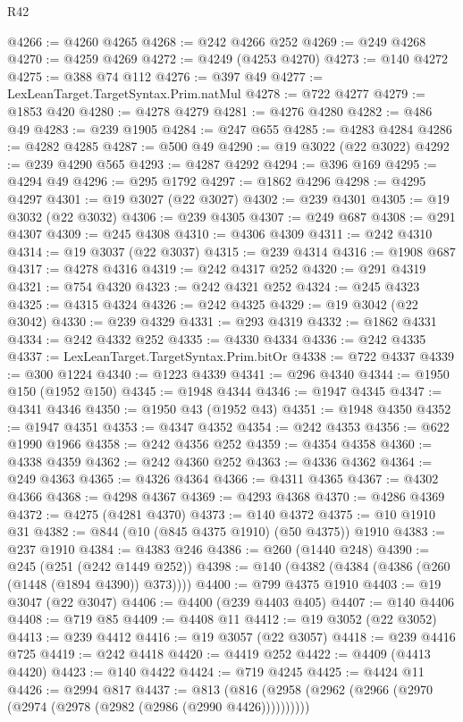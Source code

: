 \begin{lexlean}{R42}
\begin{coremodule}
{@4266 := @4260 @4265
@4268 := @242 @4266 @252
@4269 := @249 @4268
@4270 := @4259 @4269
@4272 := @4249 (@4253 @4270)
@4273 := @140 @4272
@4275 := @388 @74 @112
@4276 := @397 @49
@4277 := LexLeanTarget.TargetSyntax.Prim.natMul
@4278 := @722 @4277
@4279 := @1853 @420
@4280 := @4278 @4279
@4281 := @4276 @4280
@4282 := @486 @49
@4283 := @239 @1905
@4284 := @247 @655
@4285 := @4283 @4284
@4286 := @4282 @4285
@4287 := @500 @49
@4290 := @19 @3022 (@22 @3022)
@4292 := @239 @4290 @565
@4293 := @4287 @4292
@4294 := @396 @169
@4295 := @4294 @49
@4296 := @295 @1792
@4297 := @1862 @4296
@4298 := @4295 @4297
@4301 := @19 @3027 (@22 @3027)
@4302 := @239 @4301
@4305 := @19 @3032 (@22 @3032)
@4306 := @239 @4305
@4307 := @249 @687
@4308 := @291 @4307
@4309 := @245 @4308
@4310 := @4306 @4309
@4311 := @242 @4310
@4314 := @19 @3037 (@22 @3037)
@4315 := @239 @4314
@4316 := @1908 @687
@4317 := @4278 @4316
@4319 := @242 @4317 @252
@4320 := @291 @4319
@4321 := @754 @4320
@4323 := @242 @4321 @252
@4324 := @245 @4323
@4325 := @4315 @4324
@4326 := @242 @4325
@4329 := @19 @3042 (@22 @3042)
@4330 := @239 @4329
@4331 := @293 @4319
@4332 := @1862 @4331
@4334 := @242 @4332 @252
@4335 := @4330 @4334
@4336 := @242 @4335
@4337 := LexLeanTarget.TargetSyntax.Prim.bitOr
@4338 := @722 @4337
@4339 := @300 @1224
@4340 := @1223 @4339
@4341 := @296 @4340
@4344 := @1950 @150 (@1952 @150)
@4345 := @1948 @4344
@4346 := @1947 @4345
@4347 := @4341 @4346
@4350 := @1950 @43 (@1952 @43)
@4351 := @1948 @4350
@4352 := @1947 @4351
@4353 := @4347 @4352
@4354 := @242 @4353
@4356 := @622 @1990 @1966
@4358 := @242 @4356 @252
@4359 := @4354 @4358
@4360 := @4338 @4359
@4362 := @242 @4360 @252
@4363 := @4336 @4362
@4364 := @249 @4363
@4365 := @4326 @4364
@4366 := @4311 @4365
@4367 := @4302 @4366
@4368 := @4298 @4367
@4369 := @4293 @4368
@4370 := @4286 @4369
@4372 := @4275 (@4281 @4370)
@4373 := @140 @4372
@4375 := @10 @1910 @31
@4382 := @844 (@10 (@845 @4375 @1910) (@50 @4375)) @1910
@4383 := @237 @1910
@4384 := @4383 @246
@4386 := @260 (@1440 @248)
@4390 := @245 (@251 (@242 @1449 @252))
@4398 := @140 (@4382 (@4384 (@4386 (@260 (@1448 (@1894 @4390)) @373))))
@4400 := @799 @4375 @1910
@4403 := @19 @3047 (@22 @3047)
@4406 := @4400 (@239 @4403 @405)
@4407 := @140 @4406
@4408 := @719 @85
@4409 := @4408 @11
@4412 := @19 @3052 (@22 @3052)
@4413 := @239 @4412
@4416 := @19 @3057 (@22 @3057)
@4418 := @239 @4416 @725
@4419 := @242 @4418
@4420 := @4419 @252
@4422 := @4409 (@4413 @4420)
@4423 := @140 @4422
@4424 := @719 @4245
@4425 := @4424 @11
@4426 := @2994 @817
@4437 := @813 (@816 (@2958 (@2962 (@2966 (@2970 (@2974 (@2978 (@2982 (@2986 (@2990 @4426))))))))))
}
\end{coremodule}
\end{lexlean}
